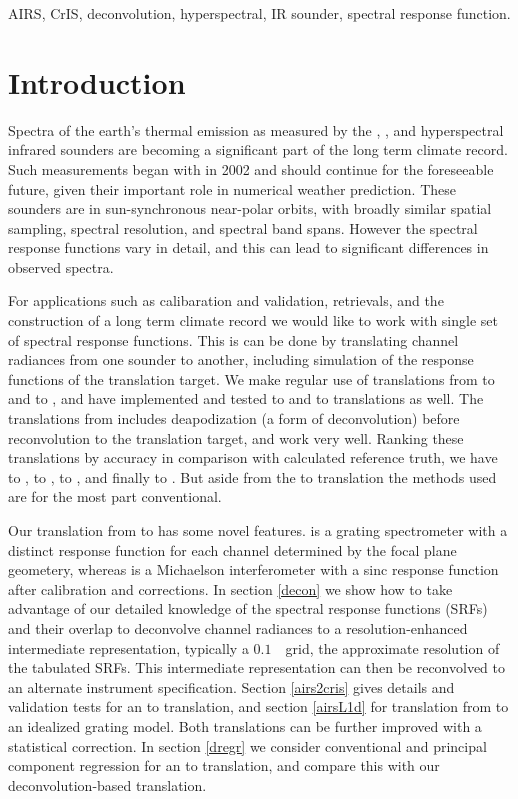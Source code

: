 \documentclass[journal]{IEEEtran}
\begin{document}
\begin{IEEEkeywords}
AIRS, CrIS, deconvolution, hyperspectral, IR sounder,
spectral response function.
\end{IEEEkeywords}

\section{Introduction}

Spectra of the earth's thermal emission as measured by the {\airs}
\cite{airs1}, {\cris} \cite{cris1,cris2}, and {\iasi} \cite{iasi1}
hyperspectral infrared sounders are becoming a significant part of
the long term climate record.  Such measurements began with {\airs}
in 2002 and should continue for the foreseeable future, given their
important role in numerical weather prediction.  These sounders are
in sun-synchronous near-polar orbits, with broadly similar spatial
sampling, spectral resolution, and spectral band spans.  However the
spectral response functions vary in detail, and this can lead to
significant differences in observed spectra.

For applications such as calibaration and validation, retrievals,
and the construction of a long term climate record we would like 
to work with single set of spectral response functions.  This is
can be done by translating channel radiances from one sounder to
another, including simulation of the response functions of the
translation target.  We make regular use of translations from
{\airs} to {\cris} and {\iasi} to {\cris}, and have implemented and
tested {\iasi} to {\airs} and {\cris} to {\airs} translations as
well.  The translations from {\iasi} includes deapodization (a form
of deconvolution) before reconvolution to the translation target,
and work very well.  Ranking these translations by accuracy in
comparison with calculated reference truth, we have {\iasi} to
{\cris}, {\iasi} to {\airs}, {\airs} to {\cris}, and finally {\cris}
to {\airs} \cite{git:decon}.  But aside from the {\airs} to {\cris}
translation the methods used are for the most part conventional.

Our translation from {\airs} to {\cris} has some novel features.
{\airs} is a grating spectrometer with a distinct response function
for each channel determined by the focal plane geometery, whereas
{\cris} is a Michaelson interferometer with a sinc response function
after calibration and corrections.  In section \ref{decon} we show
how to take advantage of our detailed knowledge of the {\airs}
spectral response functions (SRFs) and their overlap to deconvolve
channel radiances to a resolution-enhanced intermediate
representation, typically a $0.1$~\wn\ grid, the approximate
resolution of the tabulated {\airs} SRFs.  This intermediate
representation can then be reconvolved to an alternate instrument
specification.  Section \ref{airs2cris} gives details and validation
tests for an {\airs} to {\cris} translation, and section
\ref{airsL1d} for translation from {\airs} to an idealized grating
model.  Both translations can be further improved with a statistical
correction.  In section \ref{dregr} we consider conventional and
principal component regression for an {\airs} to {\cris}
translation, and compare this with our deconvolution-based
translation.
\end{document}
